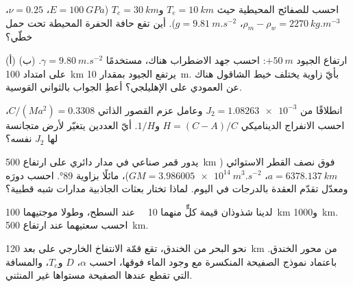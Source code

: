 \begin{exercise}[$\star$]\label{exo:b3:gravity-geodesy:4}
احسب   للصفائح المحيطية حيث
$T_e = \qty{10}{km}$ و$T_e = \qty{30}{km}$ ($E = \qty{100}{GPa}$،
$\nu = 0.25$، $\rho_m - \rho_w = \qty{2270}{kg.m^{-3}}$، $g =
\qty{9.81}{m.s^{-2}}$). أين تقع حافة الحفرة المحيطة  تحت
حمل خطّي؟
\end{exercise}

\begin{exercise}[$\star\star$]\label{exo:b3:gravity-geodesy:5}
(أ) ارتفاع الجيود $+\qty{50}{m}$: احسب جهد الاضطراب هناك،
مستخدمًا $\gamma = \qty{9.80}{m.s^{-2}}$. (ب) على امتداد \qty{100}{km} يرتفع الجيود
بمقدار \qty{10}{m}. بأيّ زاوية يختلف خيط الشاقول هناك عن العمودي على
الإهليلجي؟ أعطِ الجواب بالثواني القوسية.
\end{exercise}

\begin{exercise}[$\star\star$]\label{exo:b3:gravity-geodesy:6}
انطلاقًا من $J_2 = \num{1.08263e-3}$ وعامل عزم القصور الذاتي
$C/(Ma^2) = \num{0.3308}$، احسب الانفراج الديناميكي $H = (C - A)/C$
و$1/H$. أيّ العددين يتغيّر لأرض متجانسة لها $J_2$ نفسه؟
\end{exercise}

\begin{exercise}[$\star\star$]\label{exo:b3:gravity-geodesy:7}
يدور قمر صناعي في مدار دائري على ارتفاع \qty{500}{km} فوق نصف القطر الاستوائي
($a = \qty{6378.137}{km}$، $GM = \qty{3.986005e14}{m^3.s^{-2}}$)، مائلًا بزاوية
\ang{89}. احسب دورَه ومعدّل تقدّم العقدة بالدرجات في اليوم.
لماذا تختار بعثات الجاذبية مدارات شبه قطبية؟
\end{exercise}

\begin{exercise}[$\star\star$]\label{exo:b3:gravity-geodesy:8}
لدينا شذوذان قيمة كلٍّ منهما \qty{10}{\milli\gal} عند السطح، وطولا موجتيهما
\qty{100}{km} و\qty{1000}{km}. احسب سعتيهما عند
ارتفاع \qty{500}{km}.
\end{exercise}

\begin{exercise}[$\star\star$]\label{exo:b3:gravity-geodesy:9}
نحو البحر من الخندق، تقع قمّة الانتفاخ الخارجي على بعد \qty{120}{km} من
محور الخندق. باعتماد نموذج الصفيحة المنكسرة مع وجود الماء فوقها، احسب
$\alpha$، $D$ و$T_e$، والمسافة التي تقطع عندها الصفيحة
مستواها غير المنثني.
\end{exercise}

